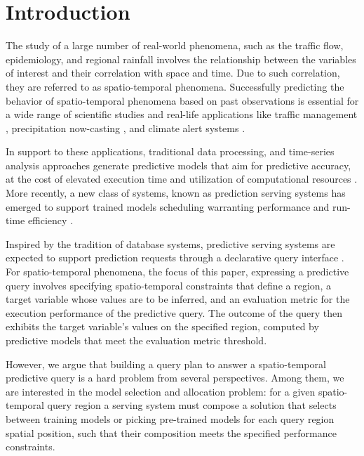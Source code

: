\chapter[Introduction]{Introduction}\label{chap_intro}

    The study of a large number of real-world phenomena, such as the traffic flow, epidemiology, and regional rainfall involves the relationship between the variables of interest and their correlation with space and time. Due to such correlation, they are referred to as spatio-temporal phenomena. Successfully predicting the behavior of spatio-temporal phenomena based on past observations is essential for a wide range of scientific studies and real-life applications like traffic management \cite{Shahriari2020}, precipitation now-casting \cite{Souto2018}, and climate alert systems \cite{Murat2018}.

    In support to these applications, traditional data processing, and time-series analysis approaches generate predictive models that aim for predictive accuracy, at the cost of elevated execution time and utilization of computational resources \cite{Hassani2015, Yang2020}. More recently, a new class of systems, known as prediction serving systems has emerged to support trained models scheduling warranting performance and run-time efficiency \cite{Crankshaw2018, Ghanta2019MLHealth, Lee2017, Polyzotis2018}. 
    
    Inspired by the tradition of database systems, predictive serving systems are expected to support prediction requests through a declarative query interface \cite{Crankshaw2018}. For spatio-temporal phenomena, the focus of this paper, expressing a predictive query involves specifying spatio-temporal constraints that define a region, a target variable whose values are to be inferred, and an evaluation metric for the execution performance of the predictive query. The outcome of the query then exhibits the target variable's values on the specified region, computed by predictive models that meet the evaluation metric threshold.
    
    However, we argue that building a query plan to answer a spatio-temporal predictive query is a hard problem from several perspectives. Among them, we are interested in the model selection and allocation problem: for a given spatio-temporal query region a serving system must compose a solution that selects between training models or picking pre-trained models for each query region spatial position, such that their composition meets the specified performance constraints.
    

